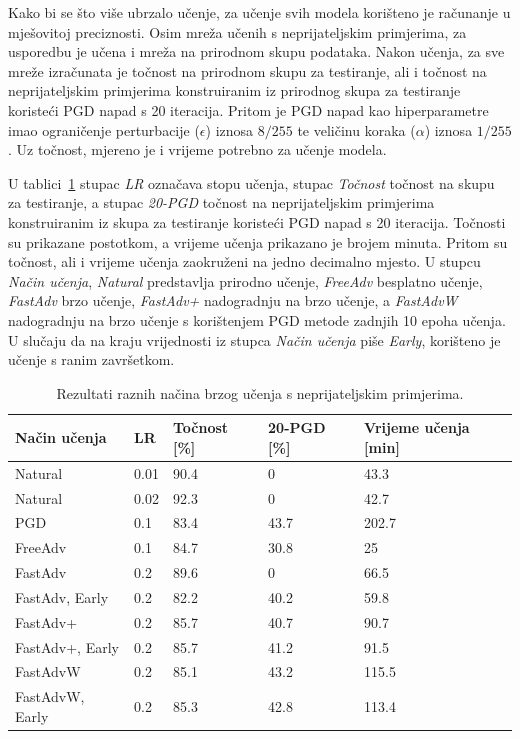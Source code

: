 \documentclass[times, utf8, zavrsni, numeric]{fer}
\begin{document}
Kako bi se što više ubrzalo učenje, za učenje svih modela korišteno je računanje u mješovitoj preciznosti.
Osim mreža učenih s neprijateljskim primjerima, za usporedbu je učena i mreža na prirodnom skupu podataka. Nakon učenja, za sve mreže izračunata je točnost na prirodnom skupu za testiranje,
ali i točnost na neprijateljskim primjerima konstruiranim iz prirodnog skupa za testiranje koristeći PGD napad s 20 iteracija. 
Pritom je PGD napad kao hiperparametre imao ograničenje perturbacije ($\epsilon$) iznosa $8/255$ te veličinu koraka ($\alpha$) iznosa $1/255$.
Uz točnost, mjereno je i vrijeme potrebno za učenje modela.

U tablici~\ref{tbl:mjerenja_robusno_ucenje} stupac \textit{LR} označava stopu učenja, stupac \textit{Točnost} točnost na skupu za testiranje, a stupac \textit{20-PGD} točnost na neprijateljskim primjerima konstruiranim iz skupa za testiranje koristeći PGD napad s 20 iteracija.
Točnosti su prikazane postotkom, a vrijeme učenja prikazano je brojem minuta. Pritom su točnost, ali i vrijeme učenja zaokruženi na jedno decimalno mjesto.
U stupcu \textit{Način učenja}, \textit{Natural} predstavlja prirodno učenje, \textit{FreeAdv} besplatno učenje, \textit{FastAdv} brzo učenje, 
\textit{FastAdv+} nadogradnju na brzo učenje, a \textit{FastAdvW} nadogradnju na brzo učenje s korištenjem PGD metode zadnjih 10 epoha učenja.
U slučaju da na kraju vrijednosti iz stupca \textit{Način učenja} piše \textit{Early}, korišteno je učenje s ranim završetkom.

\pagebreak

\begin{table}[htb]
    \caption{Rezultati raznih načina brzog učenja s neprijateljskim primjerima.}
    \label{tbl:mjerenja_robusno_ucenje}
    \centering
    \begin{tabular}{lllll} \hline
    Način učenja & LR & Točnost [\%] & 20-PGD [\%] & Vrijeme učenja [min]\\ \hline
    Natural & 0.01 & 90.4 & 0 & 43.3 \\
    Natural & 0.02 & 92.3 & 0 & 42.7 \\
    PGD & 0.1 & 83.4 & 43.7 & 202.7 \\
    FreeAdv & 0.1 & 84.7 & 30.8 & 25 \\
    FastAdv & 0.2 & 89.6 & 0 & 66.5 \\
    FastAdv, Early & 0.2 & 82.2 & 40.2 & 59.8 \\
    FastAdv+ & 0.2 & 85.7 & 40.7 & 90.7 \\
    FastAdv+, Early & 0.2 & 85.7 & 41.2 & 91.5 \\
    FastAdvW & 0.2 & 85.1 & 43.2 & 115.5 \\
    FastAdvW, Early & 0.2 & 85.3 & 42.8 & 113.4 \\ \hline
    \end{tabular}
\end{table}    
\end{document}
